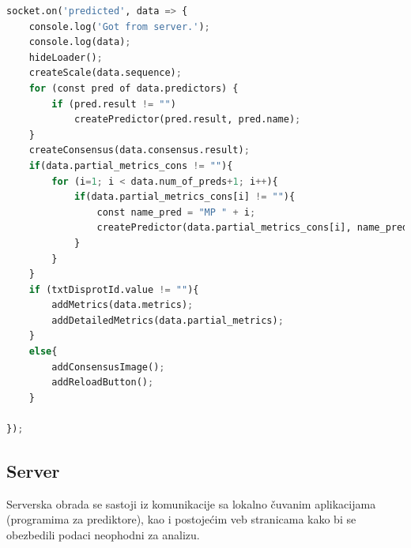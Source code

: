 \begin{lstlisting}[language=Python]
socket.on('predicted', data => {
    console.log('Got from server.');
    console.log(data);
    hideLoader(); 
    createScale(data.sequence);
    for (const pred of data.predictors) {
        if (pred.result != "")
            createPredictor(pred.result, pred.name);
    }
    createConsensus(data.consensus.result);
    if(data.partial_metrics_cons != ""){
        for (i=1; i < data.num_of_preds+1; i++){
            if(data.partial_metrics_cons[i] != ""){
                const name_pred = "MP " + i;
                createPredictor(data.partial_metrics_cons[i], name_pred);
            }
        }
    }
    if (txtDisprotId.value != ""){ 
        addMetrics(data.metrics);
        addDetailedMetrics(data.partial_metrics);
    }
    else{
        addConsensusImage();
        addReloadButton();
    }
    
});
\end{lstlisting} 

\subsection{Server} 
 Serverska obrada se sastoji iz komunikacije sa lokalno čuvanim aplikacijama (programima za prediktore), kao i postojećim veb stranicama kako bi se obezbedili podaci neophodni za analizu.\\
 
